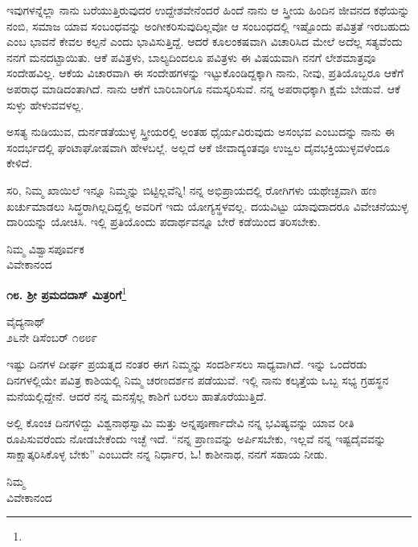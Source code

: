 ಇವುಗಳನ್ನೆಲ್ಲಾ ನಾನು ಬರೆಯುತ್ತಿರುವುದರ ಉದ್ದೇಶವೇನೆಂದರೆ ಹಿಂದೆ ನಾನು ಆ ಸ್ತ್ರೀಯ ಹಿಂದಿನ ಜೀವನದ ಕಥೆಯನ್ನು ನಂಬಿ, ಸಮಾಜ ಯಾವ ಸಂಬಂಧವನ್ನು ಅಂಗೀಕರಿಸುವುದಿಲ್ಲವೋ ಆ ಸಂಬಂಧದಲ್ಲಿ ಇಷ್ಟೊಂದು ಪವಿತ್ರತೆ ಇರಬಹುದು ಎಂಬ ಭಾವನೆ ಕೇವಲ ಕಲ್ಪನೆ ಎಂದು ಭಾವಿಸುತ್ತಿದ್ದೆ. ಆದರೆ ಕೂಲಂಕಷವಾಗಿ ವಿಚಾರಿಸಿದ ಮೇಲೆ ಅದೆಲ್ಲ ಸತ್ಯವೆಂದು ನನಗೆ ಮನದಟ್ಟಾಯಿತು. ಆಕೆ ಪವಿತ್ರಳು, ಬಾಲ್ಯದಿಂದಲೂ ಪವಿತ್ರಳು \enginline{-} ಈ ವಿಷಯವಾಗಿ ನನಗೆ ಲೇಶಮಾತ್ರವೂ ಸಂದೇಹವಿಲ್ಲ. ಆಕೆಯ ವಿಚಾರವಾಗಿ ಈ ಸಂದೇಹಗಳನ್ನು ಇಟ್ಟುಕೊಂಡಿದ್ದಕ್ಕಾಗಿ ನಾನು, ನೀವು, ಪ್ರತಿಯೊಬ್ಬರೂ ಆಕೆಗೆ ಅಪರಾಧ ಮಾಡಿದಂತಾಗಿದೆ. ನಾನು ಆಕೆಗೆ ಬಾರಿಬಾರಿಗೂ ನಮಸ್ಕರಿಸುವೆ. ನನ್ನ ಅಪರಾಧಕ್ಕಾಗಿ ಕ್ಷಮೆ ಬೇಡುವೆ. ಆಕೆ ಸುಳ್ಳು ಹೇಳುವವಳಲ್ಲ.

ಅಸತ್ಯ ನುಡಿಯುವ, ದುರ್ನಡತೆಯುಳ್ಳ ಸ್ತ್ರೀಯರಲ್ಲಿ ಅಂತಹ ಧೈರ್ಯವಿರುವುದು ಅಸಂಭವ ಎಂಬುದನ್ನು ನಾನು ಈ ಸಂದರ್ಭದಲ್ಲಿ ಘಂಟಾಘೋಷವಾಗಿ ಹೇಳಬಲ್ಲೆ. ಅಲ್ಲದೆ ಆಕೆ ಜೀವಾದ್ಯಂತವೂ ಉಜ್ವಲ ದೈವಭಕ್ತಿಯುಳ್ಳವಳೆಂದೂ ಕೇಳಿದೆ.

ಸರಿ, ನಿಮ್ಮ ಖಾಯಿಲೆ ಇನ್ನೂ ನಿಮ್ಮನ್ನು ಬಿಟ್ಟಿಲ್ಲವೆನ್ನಿ! ನನ್ನ ಅಭಿಪ್ರಾಯದಲ್ಲಿ ರೋಗಿಗಳು ಯಥೇಚ್ಛವಾಗಿ ಹಣ ಖರ್ಚುಮಾಡಲು ಸಿದ್ಧರಾಗಿಲ್ಲದಿದ್ದಲ್ಲಿ ಅವರಿಗೆ ಇದು ಯೋಗ್ಯಸ್ಥಳವಲ್ಲ. ದಯವಿಟ್ಟು ಯಾವುದಾದರೂ ವಿವೇಚನೆಯುಳ್ಳ ದಾರಿಯನ್ನು ಯೋಚಿಸಿ. ಇಲ್ಲಿ ಪ್ರತಿಯೊಂದು ಪದಾರ್ಥವನ್ನೂ ಬೇರೆ ಕಡೆಯಿಂದ ತರಿಸಬೇಕು.

\vspace{-0.3cm}

{\flushright
ನಿಮ್ಮ ವಿಶ್ವಾಸಪೂರ್ವಕ\\ವಿವೇಕಾನಂದ\par}

\begin{center}
\textbf{೧೮. ಶ‍್ರೀ ಪ್ರಮದದಾಸ್ ಮಿತ್ರರಿಗೆ}\footnote{}
\end{center}

\begin{flushright}
ವೈದ್ಯನಾಥ್\\೨೬ನೇ ಡಿಸೆಂಬರ್ ೧೮೮೯
\end{flushright}

ಇಷ್ಟು ದಿನಗಳ ದೀರ್ಘ ಪ್ರಯತ್ನದ ನಂತರ ಈಗ ನಿಮ್ಮನ್ನು ಸಂದರ್ಶಿಸಲು ಸಾಧ್ಯವಾಗಿದೆ. ಇನ್ನು ಒಂದೆರಡು ದಿನಗಳಲ್ಲಿಯೇ ಪವಿತ್ರ ಕಾಶಿಯಲ್ಲಿ ನಿಮ್ಮ ಚರಣದರ್ಶನ ಪಡೆಯುವೆ. ಇಲ್ಲಿ ನಾನು ಕಲ್ಕತ್ತೆಯ ಒಬ್ಬ ಸಭ್ಯ ಗ್ರಹಸ್ಥನ ಮನೆಯಲ್ಲಿದ್ದೇನೆ. ಆದರೆ ನನ್ನ ಮನಸ್ಸೆಲ್ಲ ಕಾಶಿಗೆ ಬರಲು ಹಾತೊರೆಯುತ್ತಿದೆ.

ಅಲ್ಲಿ ಕೊಂಚ ದಿನಗಳಿದ್ದು ವಿಶ್ವನಾಥಸ್ವಾಮಿ ಮತ್ತು ಅನ್ನಪೂರ್ಣಾದೇವಿ ನನ್ನ ಭವಿಷ್ಯವನ್ನು ಯಾವ ರೀತಿ ರೂಪಿಸುವರೆಂದು ನೋಡಬೇಕೆಂದು ಇಚ್ಛೆ ಇದೆ. “ನನ್ನ ಪ್ರಾಣವನ್ನು ಅರ್ಪಿಸಬೇಕು, ಇಲ್ಲವೆ ನನ್ನ ಇಷ್ಟದೈವವನ್ನು ಸಾಕ್ಷಾತ್ಕರಿಸಿಕೊಳ್ಳ ಬೇಕು” ಎಂಬುದೇ ನನ್ನ ನಿರ್ಧಾರ, ಓ! ಕಾಶೀನಾಥ, ನನಗೆ ಸಹಾಯ ನೀಡು.

{\flushright
ನಿಮ್ಮ\\ವಿವೇಕಾನಂದ\par}
\vspace{-0.2cm}

